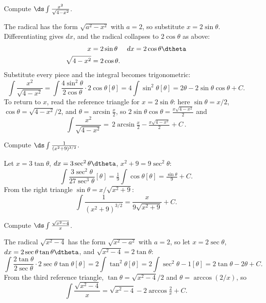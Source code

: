 \begin{example}
	Compute $\ds \int{\frac{x^2}{\sqrt{4 - x^2}}}$.

	\solution
	The radical has the form $\sqrt{a^2 - x^2}$ with $a = 2$, so substitute
	$x = 2\sin\theta$. Differentiating gives $dx$, and the radical collapses to
	$2\cos\theta$ as above:
	\[
		\begin{aligned}
			x &= 2\sin\theta   &  dx &= 2\cos\theta\dtheta \\
			\sqrt{4 - x^2} &= 2\cos\theta. &&
		\end{aligned}
	\]
	Substitute every piece and the integral becomes trigonometric:
	\[
		\int{\frac{x^2}{\sqrt{4 - x^2}}}
		   = \int{\frac{4\sin^2\theta}{2\cos\theta} \cdot 2\cos\theta}[\theta]
		   = 4\int{\sin^2\theta}[\theta]
		   = 2\theta - 2\sin\theta\cos\theta + C.
	\]
	To return to $x$, read the reference triangle for $x = 2\sin\theta$: here
	$\sin\theta = x/2$, $\cos\theta = \sqrt{4 - x^2}/2$, and
	$\theta = \arcsin\tfrac{x}{2}$, so $2\sin\theta\cos\theta = \tfrac{x\sqrt{4 - x^2}}{2}$ and
	\[
		\int{\frac{x^2}{\sqrt{4 - x^2}}}
		   = \boxed{\,2\arcsin\tfrac{x}{2} - \tfrac{x\sqrt{4 - x^2}}{2} + C\,}.
	\]
\end{example}


\begin{exercise}
	Compute $\ds \int{\frac{1}{(x^2 + 9)^{3/2}}}$.
\end{exercise}
\begin{solution}[2.5in]
	Let $x = 3\tan\theta$, $dx = 3\sec^2\theta\dtheta$,
	$x^2 + 9 = 9\sec^2\theta$:
	\[
		\int{\frac{3\sec^2\theta}{27\sec^3\theta}}[\theta]
		   = \tfrac{1}{9}\int{\cos\theta}[\theta]
		   = \tfrac{\sin\theta}{9} + C.
	\]
	From the right triangle $\sin\theta = x/\sqrt{x^2 + 9}$:
	\[
		\int{\frac{1}{(x^2 + 9)^{3/2}}}
		   = \boxed{\frac{x}{9\sqrt{x^2 + 9}} + C}.
	\]
\end{solution}

\begin{exercise}
	Compute $\ds \int{\frac{\sqrt{x^2 - 4}}{x}}$.
\end{exercise}
\begin{solution}[2.75in]
	The radical $\sqrt{x^2 - 4}$ has the form $\sqrt{x^2 - a^2}$ with
	$a = 2$, so let $x = 2\sec\theta$, $dx = 2\sec\theta\tan\theta\dtheta$,
	and $\sqrt{x^2 - 4} = 2\tan\theta$:
	\[
		\int{\frac{2\tan\theta}{2\sec\theta}\cdot 2\sec\theta\tan\theta}[\theta]
		   = 2\int{\tan^2\theta}[\theta]
		   = 2\int{\sec^2\theta - 1}[\theta]
		   = 2\tan\theta - 2\theta + C.
	\]
	From the third reference triangle, $\tan\theta = \sqrt{x^2 - 4}/2$ and
	$\theta = \arccos(2/x)$, so
	\[
		\int{\frac{\sqrt{x^2 - 4}}{x}}
		   = \boxed{\sqrt{x^2 - 4} - 2\arccos\tfrac{2}{x} + C}.
	\]
\end{solution}

